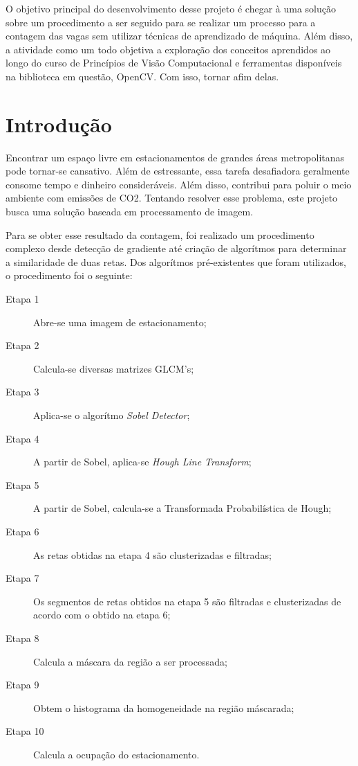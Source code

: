 \documentclass[10pt,twocolumn,letterpaper]{article}
\begin{document}
	O objetivo principal do desenvolvimento desse projeto é chegar à uma solução sobre
um procedimento a ser seguido para se realizar um processo para a contagem das vagas
sem utilizar técnicas de aprendizado de máquina. Além disso, a
atividade como um todo objetiva a exploração dos conceitos aprendidos ao longo do curso
de Princípios de Visão Computacional e ferramentas disponíveis na biblioteca em questão,
OpenCV{\footnotesize \cite{opencv}}. Com isso, tornar afim delas.





\section{Introdução}

	Encontrar um espaço livre em estacionamentos de grandes áreas metropolitanas
pode tornar-se cansativo. Além de estressante, essa tarefa desafiadora geralmente
consome tempo e dinheiro consideráveis. Além disso, contribui para poluir o meio
ambiente com emissões de CO2. Tentando resolver esse problema, este projeto busca
uma solução baseada em processamento de imagem.

	Para se obter esse resultado da contagem, foi realizado um procedimento complexo
desde detecção de gradiente até criação de algorítmos para determinar a similaridade de
duas retas. Dos algorítmos pré-existentes que foram utilizados, o procedimento foi o seguinte:


\begin{description}
\item [Etapa 1] Abre-se uma imagem de estacionamento;
\item [Etapa 2] Calcula-se diversas matrizes GLCM's;
\item [Etapa 3] Aplica-se o algorítmo {\em Sobel Detector}{\footnotesize \cite{sobel1}};
\item [Etapa 4] A partir de Sobel, aplica-se {\em Hough Line Transform};
\item [Etapa 5] A partir de Sobel, calcula-se a Transformada Probabilística de Hough;
\item [Etapa 6] As retas obtidas na etapa 4 são clusterizadas e filtradas;
\item [Etapa 7] Os segmentos de retas obtidos na etapa 5 são filtradas e clusterizadas de acordo com o obtido na etapa 6;
\item [Etapa 8] Calcula a máscara da região a ser processada;
\item [Etapa 9] Obtem o histograma da homogeneidade na região máscarada;
\item [Etapa 10] Calcula a ocupação do estacionamento.
\end{description}
\end{document}
